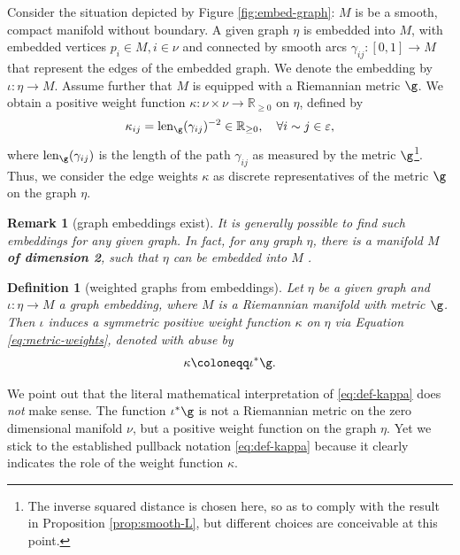 \documentclass[10pt,reqno]{amsart}
\numberwithin{equation}{section}
\theoremstyle{bfnote}
\theoremstyle{bfdef}
\newtheorem{definition}[theorem]{Definition}
\newtheorem{remark}[theorem]{Remark}
\newcommand{\R}{\mathbb{R}}
\newcommand{\veps}{\varepsilon}
\renewcommand\o\operatorname
\begin{document}
Consider the situation depicted by Figure \ref{fig:embed-graph}: 
$M$ is be a smooth, compact manifold without boundary. A given graph $\eta$ is embedded into $M$, with embedded vertices $p_i \in M, i \in \nu$ and connected by smooth arcs $\gamma_{ij} : [0,1] \to M$ that represent the edges of the embedded graph. We denote the embedding by $\iota : \eta \to M$.
%
Assume further that $M$ is equipped with a Riemannian metric $\g$. We obtain a positive weight function $\kappa : \nu \times \nu \to \R_{\geq 0}$ on $\eta$, defined by
\begin{equation}\label{eq:metric-weights}
	\kappa_{ij} = \o{len}_{\g}(\gamma_{ij})^{-2} \in \R_{\geq 0},
	\quad \forall i \sim j \in \veps,
\end{equation}
where $\o{len}_{\g}(\gamma_{ij})$ is the length of the path $\gamma_{ij}$ as measured by the metric $\g$\footnote{
	The inverse squared distance is chosen here, so as to comply with the result in Proposition \ref{prop:smooth-L}, but different choices are conceivable at this point.
}.
%
Thus, we consider the edge weights $\kappa$ as discrete representatives of the metric $\g$ on the graph $\eta$.

\begin{remark}[graph embeddings exist]\label{rem:graph-embedding-exists}
	It is generally possible to find such embeddings for any given graph. In fact, for any graph $\eta$, there is a manifold $M$ \textbf{of dimension 2}, such that $\eta$ can be embedded into $M$ \cite{grossTopologicalGraphTheory1987}.
\end{remark}

\begin{definition}[weighted graphs from embeddings]
	Let $\eta$ be a given graph and $\iota : \eta \to M$ a graph embedding, where $M$ is a Riemannian manifold with metric $\g$. Then $\iota$ induces a symmetric positive weight function $\kappa$ on $\eta$ via Equation \eqref{eq:metric-weights}, denoted with abuse by 
\begin{equation}\label{eq:def-kappa}
\kappa \coloneqq \iota^{*} \g.
\end{equation}
\end{definition}
We point out that the literal mathematical interpretation of \eqref{eq:def-kappa} does \textit{not} make sense. The function $\iota^{*}\g$ is not a Riemannian metric on the zero dimensional manifold $\nu$, but a positive weight function on the graph $\eta$. Yet we stick to the established pullback notation \eqref{eq:def-kappa} because it clearly indicates the role of the weight function $\kappa$.
\end{document}
